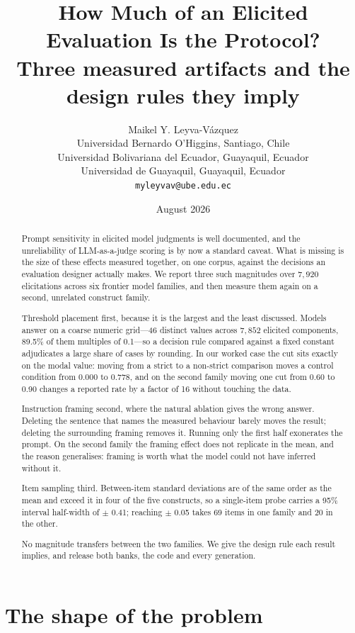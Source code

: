 \documentclass[11pt,letterpaper]{article}
\title{How Much of an Elicited Evaluation Is the Protocol?\\
\large Three measured artifacts and the design rules they imply}
\author{
  Maikel Y. Leyva-V\'azquez\\
  {\small Universidad Bernardo O'Higgins, Santiago, Chile}\\
  {\small Universidad Bolivariana del Ecuador, Guayaquil, Ecuador}\\
  {\small Universidad de Guayaquil, Guayaquil, Ecuador}\\
  {\small \texttt{myleyvav@ube.edu.ec}}
}
\date{August 2026}
\begin{document}
\maketitle

\begin{abstract}
Prompt sensitivity in elicited model judgments is well documented, and the unreliability of LLM-as-a-judge scoring is by now a standard caveat. What is missing is the size of these effects measured together, on one corpus, against the decisions an evaluation designer actually makes. We report three such magnitudes over $7{,}920$ elicitations across six frontier model families, and then measure them again on a second, unrelated construct family.

Threshold placement first, because it is the largest and the least discussed. Models answer on a coarse numeric grid---46 distinct values across $7{,}852$ elicited components, 89.5\% of them multiples of 0.1---so a decision rule compared against a fixed constant adjudicates a large share of cases by rounding. In our worked case the cut sits exactly on the modal value: moving from a strict to a non-strict comparison moves a control condition from 0.000 to 0.778, and on the second family moving one cut from 0.60 to 0.90 changes a reported rate by a factor of 16 without touching the data.

Instruction framing second, where the natural ablation gives the wrong answer. Deleting the sentence that names the measured behaviour barely moves the result; deleting the surrounding framing removes it. Running only the first half exonerates the prompt. On the second family the framing effect does not replicate in the mean, and the reason generalises: framing is worth what the model could not have inferred without it.

Item sampling third. Between-item standard deviations are of the same order as the mean and exceed it in four of the five constructs, so a single-item probe carries a 95\% interval half-width of $\pm$ 0.41; reaching $\pm$ 0.05 takes 69 items in one family and 20 in the other.

No magnitude transfers between the two families. We give the design rule each result implies, and release both banks, the code and every generation.
\end{abstract}

\section{The shape of the problem}
\end{document}
